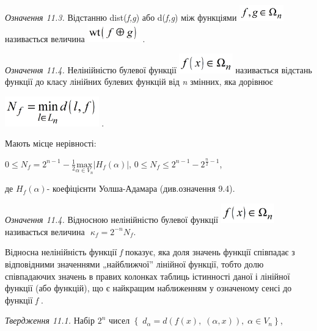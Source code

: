  \textit{Означення 11.3.}\textit{ }Відстанню
dist(\textit{f}\textit{,}\textit{g}) або d(\textit{f}\textit{,}\textit{g})  між
функціями 
\includegraphics[width=0.7563in,height=0.2701in]{crypt-img/crypt-img262.png} 
називається  величина 
\includegraphics[width=0.8917in,height=0.3173in]{crypt-img/crypt-img263.png} .

 \textit{Означення 11.4.}\textit{  }Нелінійністю булевої функції 
\includegraphics[width=0.9098in,height=0.3354in]{crypt-img/crypt-img264.png} 
називається відстань функції до класу лінійних булевих функцій від
\textit{n}\textit{ }змінних, яка дорівнює

{\centering
 \includegraphics[width=1.6008in,height=0.5071in]{crypt-img/crypt-img265.png} .
\par}

Мають місце нерівності:  

 ${0\le N_{f}=2^{n-1}-\frac{1}{2}\underset{{\alpha \in
V_{n}}}{\text{max}}|H_{f}{(\alpha )}|}$,   ${0\le N_{f}\le
2^{n-1}-2^{\frac{n}{2}-1}}$,

де  $H_f(\alpha )${}-  коефіцієнти Уолша-Адамара (див.означення 9.4).

 \textit{Означення 11.4.}\textit{ }Відносною нелінійністю булевої функції 
\includegraphics[width=0.9098in,height=0.3354in]{crypt-img/crypt-img266.png} 
називається величина   $ $ $\kappa _{f}=2^{-n}N_f$.

Відносна нелінійність функції \textit{f}  показує, яка доля значень функції
співпадає з відповідними значеннями „найближчої” лінійної функції, тобто долю
співпадаючих  значень в правих колонках таблиць істинності даної і лінійної
функції (або функцій), що є найкращим наближенням у означеному сенсі до функції
\textit{f} .

\textit{Твердження 11.1.}\textit{  }Набір  $2^n$  чисел 
$\left\{ \;d_{\alpha }=d(f(x),\;(\alpha ,x)),\;\alpha \in V_n \right\}$,

